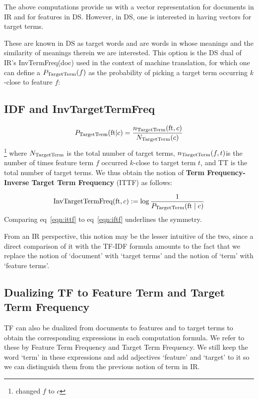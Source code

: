 \medskip
The above computations provide us with a vector representation for documents in IR and for features in DS. However, in DS, one is interested in having vectors for target terms.

These are known in DS as target words and  are words in whose meanings and the similarity of meanings therein we are interested.
This option is the DS dual of IR's  InvTermFreq(doc) used in the context of machine translation, for which one can define a $P_{\textmd{TargetTerm}}(f) $ as the  probability of picking a target term  occurring $k$-close to feature $f$: 

\subsection{IDF and InvTargetTermFreq}
\[
P_{\textmd{TargetTerm}}(\textmd{ft}|c) =
\frac{n_{\textmd{TargetTerm}}(\textmd{ft}, c)}{N_{\textmd{TargetTerm}}(c)}
\]
\footnote{changed $f$ to $c$}
where  $N_{\textmd{TargetTerm}}$ is the total number of target terms,    $n_{\textmd{TargetTerm}}(f, t)$is the number of  times feature term $f$ occurred   $k$-close to target term  $t$,  and TT is the total number of target terms. We thus obtain the notion of  {\bf Term Frequency-Inverse Target Term Frequency} (ITTF) as follows:

\begin{equation}
\label{eqn:ittf}
\textmd{InvTargetTermFreq}(\textmd{ft}, c) :=
\log{\frac{1}{P_{\textmd{TargetTerm}}(\textmd{ft}\mid c)}}
\end{equation}
Comparing eq~\ref{eqn:ittf} to eq~\ref{eqn:iftf} underlines the symmetry.

From an IR perspective, this notion may be  the  lesser intuitive of the two, since a direct comparison of it  with the TF-IDF formula amounts to the fact that  we replace the notion of `document' with `target terms' and the notion of `term' with `feature terms'.

\subsection{Dualizing TF to Feature Term and Target Term Frequency}
\label{subsec-TF}

TF can also be dualized from documents to features and to target terms to obtain the corresponding expressions in each computation formula.  We refer to these by Feature Term Frequency and Target Term  Frequency. We still keep the  word `term'  in these expressions and add adjectives `feature' and `target'  to it so we can distinguish them from the previous notion of term in IR. 

